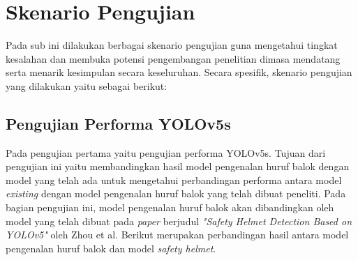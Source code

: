 \section{Skenario Pengujian}
\label{sec:skenariopengujian}

Pada sub ini dilakukan berbagai skenario pengujian guna mengetahui tingkat kesalahan dan membuka potensi pengembangan penelitian dimasa mendatang serta menarik kesimpulan secara keseluruhan. Secara spesifik, skenario pengujian yang dilakukan yaitu sebagai berikut: \par

\subsection{Pengujian Performa YOLOv5s}
\label{subsec:pengujianperformayolov5s}

Pada pengujian pertama yaitu pengujian performa YOLOv5s. Tujuan dari pengujian ini yaitu membandingkan hasil model pengenalan huruf balok dengan model yang telah ada untuk mengetahui perbandingan performa antara model \textit{existing} dengan model pengenalan huruf balok yang telah dibuat peneliti. Pada bagian pengujian ini, model pengenalan huruf balok akan dibandingkan oleh model yang telah dibuat pada \textit{paper} berjudul \textit{"Safety Helmet Detection Based on YOLOv5"} oleh Zhou et al. Berikut merupakan perbandingan hasil antara model pengenalan huruf balok dan model \textit{safety helmet}.

